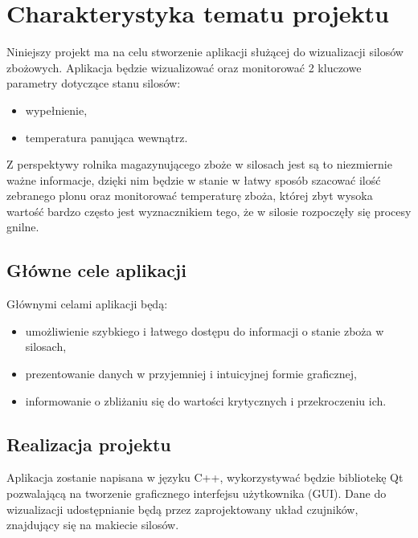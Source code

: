 \section{Charakterystyka tematu projektu}
    Niniejszy projekt ma na celu stworzenie aplikacji służącej do wizualizacji silosów zbożowych. Aplikacja będzie wizualizować oraz 
    monitorować 2 kluczowe parametry dotyczące stanu silosów:
    \begin{itemize}
        \item wypełnienie,
        \item temperatura panująca wewnątrz.
    \end{itemize} 
    Z perspektywy rolnika magazynującego zboże w silosach jest są to niezmiernie ważne informacje, dzięki nim będzie w stanie 
    w łatwy sposób szacować ilość zebranego plonu oraz monitorować temperaturę zboża, której zbyt wysoka wartość bardzo często jest 
    wyznacznikiem tego, że w silosie rozpoczęły się procesy gnilne.
    \subsection{Główne cele aplikacji}
        Głównymi celami aplikacji będą:
        \begin{itemize}
            \item umożliwienie szybkiego i łatwego dostępu do informacji o stanie zboża w silosach,
            \item prezentowanie danych w przyjemniej i intuicyjnej formie graficznej,
            \item informowanie o zbliżaniu się do wartości krytycznych i przekroczeniu ich.
        \end{itemize}
    \subsection{Realizacja projektu}
            Aplikacja zostanie napisana w języku C++, wykorzystywać będzie bibliotekę Qt pozwalającą na tworzenie graficznego interfejsu użytkownika
            (GUI). Dane do wizualizacji udostępnianie będą przez zaprojektowany układ czujników, znajdujący się na makiecie silosów. 
    

   
